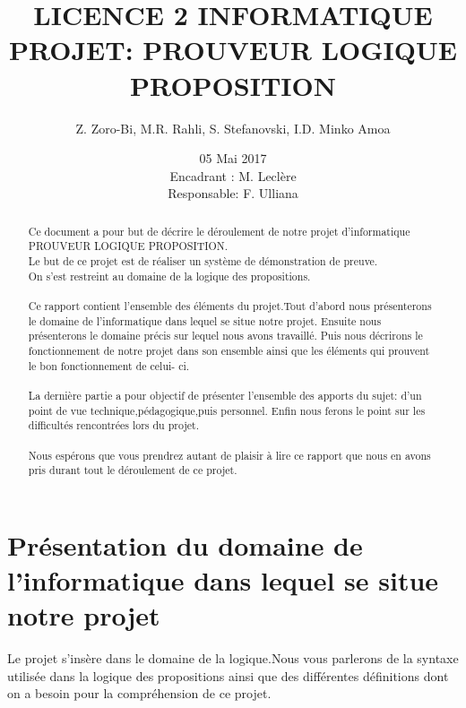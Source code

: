 \documentclass[a4paper,12pt]{article}
\title{LICENCE 2 INFORMATIQUE \\ PROJET: PROUVEUR LOGIQUE PROPOSITION}
\author{Z. Zoro-Bi, M.R. Rahli, S. Stefanovski, I.D. Minko Amoa}
\date{ 05 Mai 2017 \\ Encadrant : M. Leclère \\ Responsable: F. Ulliana \\ }
\begin{document}
\maketitle

 

\pagebreak
\begin{abstract} 

Ce document a pour but de décrire le déroulement de notre projet d'informatique PROUVEUR LOGIQUE  PROPOSITION.\\
Le but de ce projet est de réaliser un système de démonstration de preuve.\\
On s'est restreint au domaine de la logique des propositions.\\\\


Ce rapport contient l'ensemble des éléments du projet.Tout d'abord nous présenterons le  domaine de l'informatique dans lequel se situe notre projet.
Ensuite nous présenterons le domaine précis sur lequel nous avons travaillé.
Puis nous décrirons le fonctionnement de notre projet dans son ensemble ainsi que les éléments qui prouvent le bon fonctionnement de celui-
ci.\\\\

La dernière partie a pour objectif de présenter l'ensemble des apports du sujet: d'un point de vue technique,pédagogique,puis personnel.
Enfin nous ferons le point sur les difficultés rencontrées lors du projet.\\\\

Nous espérons que vous prendrez autant de plaisir à lire ce rapport que nous en avons pris
durant tout le déroulement de ce projet.





\end{abstract}

\pagebreak

\tableofcontents

\pagebreak
\section{Présentation du domaine de l'informatique dans lequel se situe notre projet}
Le projet s'insère dans le domaine de la logique.Nous vous parlerons de la syntaxe utilisée dans la logique des propositions ainsi 
que des différentes définitions dont on a besoin pour la compréhension de ce projet.
\end{document}
